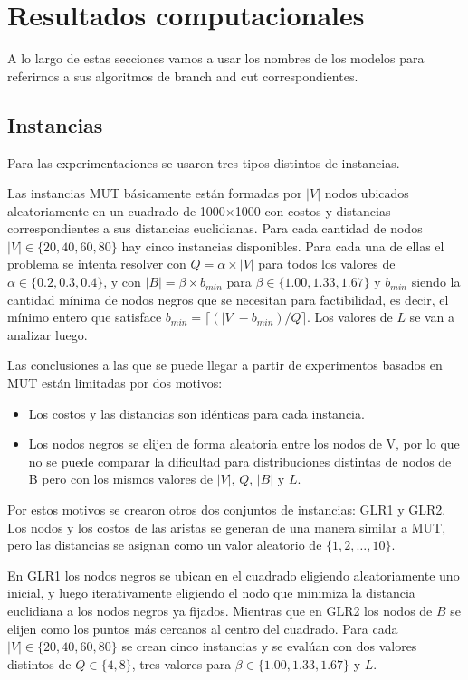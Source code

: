 \documentclass[10pt, a4paper]{article}
\theoremstyle{definition}
\begin{document}
\section{Resultados computacionales}

A lo largo de estas secciones vamos a usar los nombres de los modelos para referirnos a sus algoritmos de branch and cut correspondientes.

\subsection{Instancias}

Para las experimentaciones se usaron tres tipos distintos de instancias.

Las instancias MUT básicamente están formadas por $|V|$ nodos ubicados aleatoriamente en un cuadrado de 1000$\times$1000 con costos y distancias correspondientes a sus distancias euclidianas. Para cada cantidad de nodos $|V| \in \{20,40,60,80\}$ hay cinco instancias disponibles. Para cada una de ellas el problema se intenta resolver con $Q = \alpha \times |V|$ para todos los valores de $\alpha \in \{0{.}2, 0{.}3, 0{.}4\}$, y con $|B| = \beta \times b_{min}$ para $\beta \in \{1{.}00, 1{.}33, 1{.}67\}$ y $b_{min}$ siendo la cantidad mínima de nodos negros que se necesitan para factibilidad, es decir, el mínimo entero que satisface $b_{min} = \lceil (|V| - b_{min})/Q \rceil$. Los valores de $L$ se van a analizar luego.

Las conclusiones a las que se puede llegar a partir de experimentos basados en MUT están limitadas por dos motivos:

\begin{itemize}
	\item Los costos y las distancias son idénticas para cada instancia.
	\item Los nodos negros se elijen de forma aleatoria entre los nodos de V, por lo que no se puede comparar la dificultad para distribuciones distintas de nodos de B pero con los mismos valores de $|V|$, $Q$, $|B|$ y $L$.
\end{itemize}

Por estos motivos se crearon otros dos conjuntos de instancias: GLR1 y GLR2. Los nodos y los costos de las aristas se generan de una manera similar a MUT, pero las distancias se asignan como un valor aleatorio de $\{1,2,\dots,10\}$.

En GLR1 los nodos negros se ubican en el cuadrado eligiendo aleatoriamente uno inicial, y luego iterativamente eligiendo el nodo que minimiza la distancia euclidiana a los nodos negros ya fijados. Mientras que en GLR2 los nodos de $B$ se elijen como los puntos más cercanos al centro del cuadrado. Para cada $|V| \in \{20,40,60,80\}$ se crean cinco instancias y se evalúan con dos valores distintos de $Q \in \{4,8\}$, tres valores para $\beta \in \{1{.}00, 1{.}33, 1{.}67\}$ y $L$.
\end{document}
